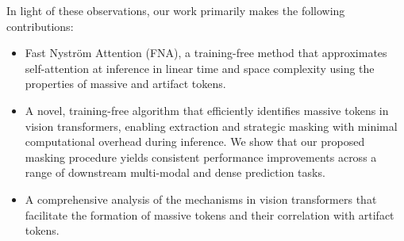 In light of these observations, our work primarily makes the following contributions:
\begin{itemize}
    \item Fast Nystr\"om Attention (FNA), a training-free method that approximates self-attention at inference in linear time and space complexity using the properties of massive and artifact tokens.
    \vspace{-0.2cm}
    \item A novel, training-free algorithm that efficiently identifies massive tokens in vision transformers, enabling extraction and strategic masking with minimal computational overhead during inference. We show that our proposed masking procedure yields consistent performance improvements across a range of downstream multi-modal and dense prediction tasks.
    \vspace{-0.2cm}
    \item A comprehensive analysis of the mechanisms in vision transformers that facilitate the formation of massive tokens and their correlation with artifact tokens.
\end{itemize}

